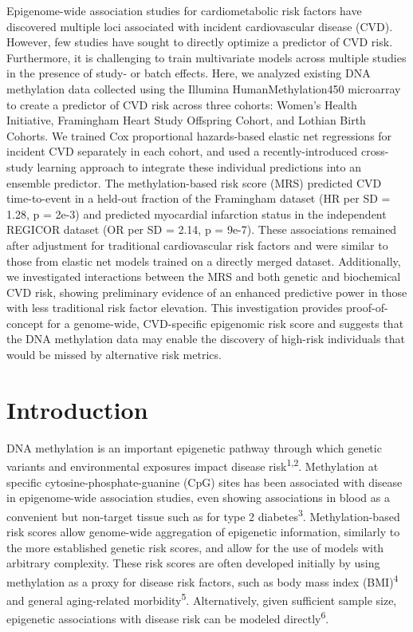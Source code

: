 \documentclass[]{article}
\begin{document}
Epigenome-wide association studies for cardiometabolic risk factors have
discovered multiple loci associated with incident cardiovascular disease
(CVD). However, few studies have sought to directly optimize a predictor
of CVD risk. Furthermore, it is challenging to train multivariate models
across multiple studies in the presence of study- or batch effects.
Here, we analyzed existing DNA methylation data collected using the
Illumina HumanMethylation450 microarray to create a predictor of CVD
risk across three cohorts: Women's Health Initiative, Framingham Heart
Study Offspring Cohort, and Lothian Birth Cohorts. We trained Cox
proportional hazards-based elastic net regressions for incident CVD
separately in each cohort, and used a recently-introduced cross-study
learning approach to integrate these individual predictions into an
ensemble predictor. The methylation-based risk score (MRS) predicted CVD
time-to-event in a held-out fraction of the Framingham dataset (HR per
SD = 1.28, p = 2e-3) and predicted myocardial infarction status in the
independent REGICOR dataset (OR per SD = 2.14, p = 9e-7). These
associations remained after adjustment for traditional cardiovascular
risk factors and were similar to those from elastic net models trained
on a directly merged dataset. Additionally, we investigated interactions
between the MRS and both genetic and biochemical CVD risk, showing
preliminary evidence of an enhanced predictive power in those with less
traditional risk factor elevation. This investigation provides
proof-of-concept for a genome-wide, CVD-specific epigenomic risk score
and suggests that the DNA methylation data may enable the discovery of
high-risk individuals that would be missed by alternative risk metrics.

\hypertarget{introduction}{%
\section{Introduction}\label{introduction}}

DNA methylation is an important epigenetic pathway through which genetic
variants and environmental exposures impact disease
risk\textsuperscript{1,2}. Methylation at specific
cytosine-phosphate-guanine (CpG) sites has been associated with disease
in epigenome-wide association studies, even showing associations in
blood as a convenient but non-target tissue such as for type 2
diabetes\textsuperscript{3}. Methylation-based risk scores allow
genome-wide aggregation of epigenetic information, similarly to the more
established genetic risk scores, and allow for the use of models with
arbitrary complexity. These risk scores are often developed initially by
using methylation as a proxy for disease risk factors, such as body mass
index (BMI)\textsuperscript{4} and general aging-related
morbidity\textsuperscript{5}. Alternatively, given sufficient sample
size, epigenetic associations with disease risk can be modeled
directly\textsuperscript{6}.
\end{document}
